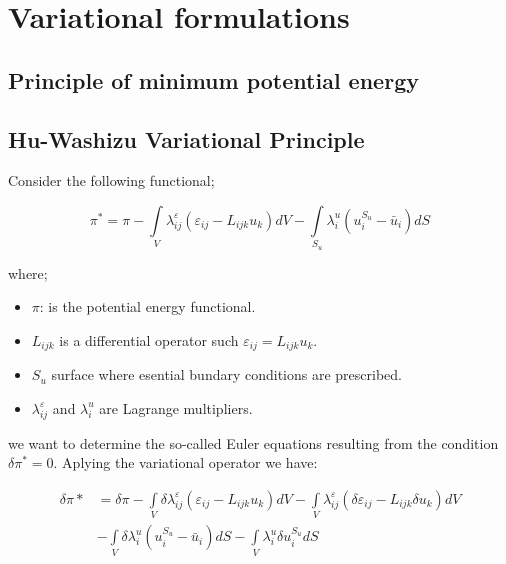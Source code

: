 \section{Variational formulations}

\subsection{Principle of minimum potential energy}

\subsection{Hu-Washizu Variational Principle}
Consider the following functional;

\begin{equation}
{\pi ^*} = \pi  - \int\limits_V {\lambda _{ij}^\varepsilon ({\varepsilon _{ij}} - {L_{ijk}}{u_k})dV}  - \int\limits_{{S_u}} {\lambda _i^u(u_i^{{S_u}} - {{\bar u}_i})dS}
\label{Hu}
\end{equation}

where;

\begin{itemize}
\item $\pi$: is the potential energy functional.
\item $L_{ijk}$ is a differential operator such ${\varepsilon _{ij}} = {L_{ijk}}{u_k}$.
\item $S_u$ surface where esential bundary conditions are prescribed.
\item $\lambda _{ij}^\varepsilon $ and ${\lambda _i^u}$ are Lagrange multipliers.
\end{itemize}

we want to determine the so-called Euler equations resulting from the condition $\delta \pi^* = 0$. Aplying the variational operator we have:

\begin{equation}
\begin{aligned}
\delta \pi *& = \delta \pi  - \int\limits_V {\delta \lambda _{ij}^\varepsilon } ({\varepsilon _{ij}} - {L_{ijk}}{u_k})dV- \int\limits_V {\lambda _{ij}^\varepsilon } (\delta {\varepsilon _{ij}} - {L_{ijk}}\delta {u_k})dV \\
&-\int\limits_V {\delta \lambda _i^u} (u_i^{{S_u}} - {\bar u_i})dS - \int\limits_V {\lambda _i^u} \delta u_i^{{S_u}}dS
\end{aligned}
\end{equation}

